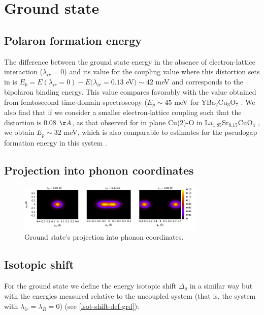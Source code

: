 \chapter{Ground state}
\label{chap:ground}

\section{Polaron formation energy}


The difference between the ground state energy in the absence of electron-lattice interaction ($\lambda_{ir}=0$) and its value for the coupling value where this distortion sets in is $E_p = E(\lambda_{ir}=0)- E(\lambda_{ir}=0.13$ eV$) \sim 42$ meV and corresponds to the bipolaron binding energy. This value compares favorably with the value obtained from femtosecond time-domain spectroscopy ($E_p \sim 45$ meV for YBa$_2$Cu$_3$O$_7$ \cite{Demsar1999}. We also find that if we consider a smaller electron-lattice coupling such that the distortion is 0.08 $\AA$, as that observed for in plane Cu(2)-O in La$_{1.85}$Sr$_{0.15}$CuO$_4$ \cite{Bianconi1996}, we obtain $E_p \sim 32$ meV, which is also comparable to estimates for the pseudogap formation energy in this system \cite{Kusar2005}.

\section{Projection into phonon coordinates}

\begin{figure}[ht!]
\centering
\includegraphics[width=0.8\textwidth]{images/ph-ground.png}
\caption{Ground state's projection into phonon coordinates.}
\label{fig:ph-ground}
\end{figure}

\section{Isotopic shift}

For the ground state we define the energy isotopic shift $\Delta_g$ in a similar way but with the energies measured relative to the uncoupled system (that is, the system with $\lambda_{ir}=\lambda_R=0$) (see \ref{isot-shift-def-grd}):

